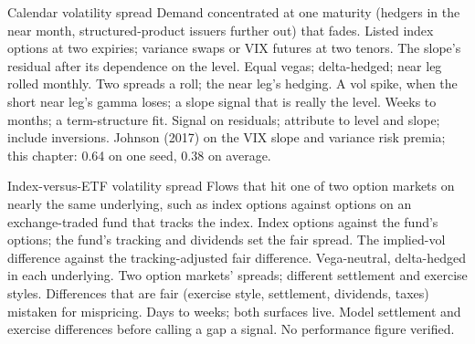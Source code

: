 \begin{strategyfile}{Calendar volatility spread}\label{strat:s2:skew-and-term-structure-relative-value:calendar}
 Demand concentrated at one maturity (hedgers in the near month, structured-product issuers further out) that fades.
 Listed index options at two expiries; variance swaps or VIX futures at two tenors.
 The slope's residual after its dependence on the level.
 Equal vegas; delta-hedged; near leg rolled monthly.
 Two spreads a roll; the near leg's hedging.
 A vol spike, when the short near leg's gamma loses; a slope signal that is really the level.
 Weeks to months; a term-structure fit.
 Signal on residuals; attribute to level and slope; include inversions.
 Johnson (2017) on the VIX slope and variance risk premia; this chapter: 0.64 on one seed, 0.38 on average.
\end{strategyfile}

\begin{strategyfile}{Index-versus-ETF volatility spread}\label{strat:s2:skew-and-term-structure-relative-value:etf}
 Flows that hit one of two option markets on nearly the same underlying, such as index options against options on an
exchange-traded fund that tracks the index.
 Index options against the fund's options; the fund's tracking and dividends set the fair spread.
 The implied-vol difference against the tracking-adjusted fair difference.
 Vega-neutral, delta-hedged in each underlying.
 Two option markets' spreads; different settlement and exercise styles.
 Differences that are fair (exercise style, settlement, dividends, taxes) mistaken for mispricing.
 Days to weeks; both surfaces live.
 Model settlement and exercise differences before calling a gap a signal.
 No performance figure verified.
\end{strategyfile}

